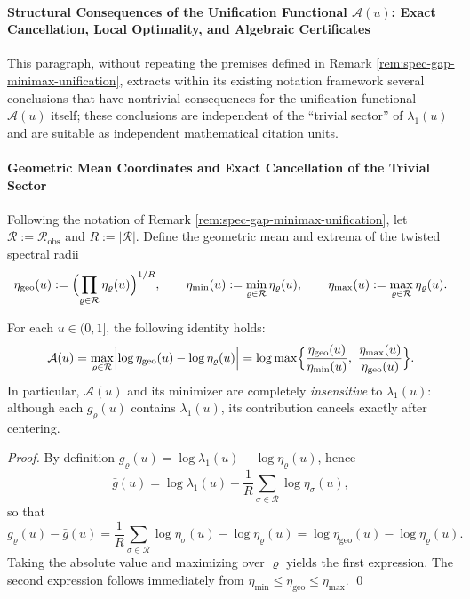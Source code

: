 \paragraph{Structural Consequences of the Unification Functional \texorpdfstring{$\mathcal{A}(u)$}{A(u)}: Exact Cancellation, Local Optimality, and Algebraic Certificates}\label{par:gut-unification-functional-structures}
This paragraph, without repeating the premises defined in Remark \ref{rem:spec-gap-minimax-unification},
extracts within its existing notation framework several conclusions that have nontrivial consequences for the unification functional \(\mathcal{A}(u)\) itself;
these conclusions are independent of the ``trivial sector'' of \(\lambda_1(u)\) and are suitable as independent mathematical citation units.

\paragraph{Geometric Mean Coordinates and Exact Cancellation of the Trivial Sector}
Following the notation of Remark \ref{rem:spec-gap-minimax-unification}, let
\(
\mathcal{R}:=\mathcal{R}_{\mathrm{obs}}
\)
and
\(
R:=|\mathcal{R}|
\).
Define the geometric mean and extrema of the twisted spectral radii
\[
\eta_{\mathrm{geo}}(u):=\Bigl(\prod_{\varrho\in\mathcal{R}}\eta_\varrho(u)\Bigr)^{1/R},
\qquad
\eta_{\min}(u):=\min_{\varrho\in\mathcal{R}}\eta_\varrho(u),
\qquad
\eta_{\max}(u):=\max_{\varrho\in\mathcal{R}}\eta_\varrho(u).
\]

\begin{proposition}\label{prop:gut-A-cancels-lambda1}
For each \(u\in(0,1]\), the following identity holds:
\[
\mathcal{A}(u)
=\max_{\varrho\in\mathcal{R}}\Bigl|\log\eta_{\mathrm{geo}}(u)-\log\eta_\varrho(u)\Bigr|
=\log\max\Bigl\{\frac{\eta_{\mathrm{geo}}(u)}{\eta_{\min}(u)},\ \frac{\eta_{\max}(u)}{\eta_{\mathrm{geo}}(u)}\Bigr\}.
\]
In particular, \(\mathcal{A}(u)\) and its minimizer are completely \emph{insensitive} to \(\lambda_1(u)\): although each \(g_\varrho(u)\) contains \(\lambda_1(u)\), its contribution cancels exactly after centering.
\end{proposition}

\begin{proof}
By definition \(g_\varrho(u)=\log\lambda_1(u)-\log\eta_\varrho(u)\), hence
\[
\bar g(u)=\log\lambda_1(u)-\frac{1}{R}\sum_{\sigma\in\mathcal{R}}\log\eta_\sigma(u),
\]
so that
\[
g_\varrho(u)-\bar g(u)
=\frac{1}{R}\sum_{\sigma\in\mathcal{R}}\log\eta_\sigma(u)-\log\eta_\varrho(u)
=\log\eta_{\mathrm{geo}}(u)-\log\eta_\varrho(u).
\]
Taking the absolute value and maximizing over \(\varrho\) yields the first expression.
The second expression follows immediately from \(\eta_{\min}\le \eta_{\mathrm{geo}}\le \eta_{\max}\). \qed
\end{proof}

